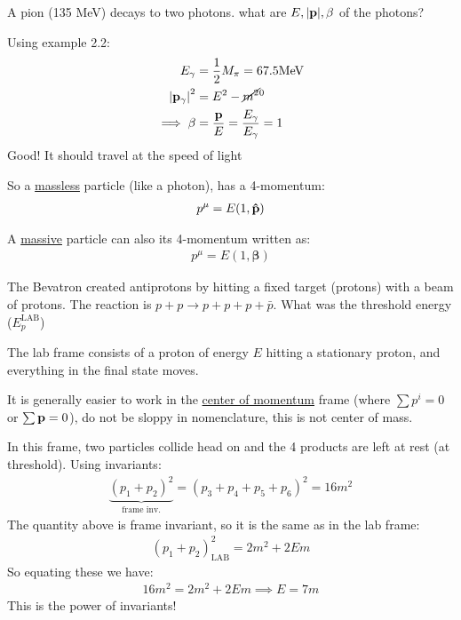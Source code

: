 \begin{example}
  A pion (135 MeV) decays to two photons. what are $E,\abs{\vb{p}},\beta$ of the photons?

  Using example 2.2:
  \begin{align*}
    E_\gamma&=\frac12M_\pi=67.5\text{MeV}\\
    \abs{\vb{p}_\gamma}^2&=E^2-\cancel{m^2}^0\\
    \implies\beta&=\frac{\vb{p}}{E}=\frac{E_\gamma}{E_\gamma}=1
  \end{align*}
  Good! It should travel at the speed of light

  So a \underline{massless} particle (like a photon), has a 4-momentum:
  \begin{align*}
    p^\mu=E(1,\vu{p})
  \end{align*}

  A \underline{massive} particle can also its 4-momentum written as:
  \begin{align*}
    p^\mu=E(1,\bm{\beta})
  \end{align*}
\end{example}

\begin{example}
  The Bevatron created antiprotons by hitting a fixed target (protons) with a beam of protons. The reaction is $p+p\to p+p+p+\bar{p}$. What was the threshold energy ($E_p^{\text{LAB}}$)

  The lab frame consists of a proton of energy $E$ hitting a stationary proton, and everything in the final state moves.

It is generally easier to work in the \underline{center of momentum} frame (where $\sum p^i=0$ or $\sum\vb{p}=0$), do not be sloppy in nomenclature, this is not center of mass.

In this frame, two particles collide head on and the 4 products are left at rest (at threshold). Using invariants:
\begin{align*}
  \underbrace{(p_1+p_2)^2}_{\text{frame inv.}}
  =(p_3+p_4+p_5+p_6)^2=16m^2
\end{align*}
The quantity above is frame invariant, so it is the same as in the lab frame:
\begin{align*}
  (p_1+p_2)^2_{\text{LAB}}=2m^2+2Em
\end{align*}
So equating these we have:
\begin{align*}
  16m^2=2m^2+2Em\implies E=7m
\end{align*}
This is the power of invariants!
\end{example}

